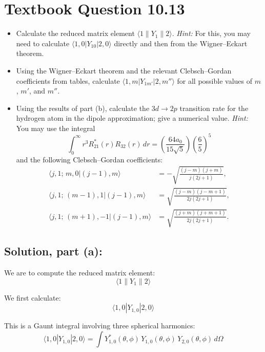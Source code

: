 \documentclass[12pt]{article}
\begin{document}
\section{Textbook Question 10.13}
    \begin{itemize}
        \item [(a)] Calculate the reduced matrix element $\langle 1 \| Y_1 \| 2 \rangle$. \textit{Hint:} For this, you may need to calculate $\langle 1, 0|Y_{10}|2, 0 \rangle$ directly and then from the Wigner–Eckart theorem.
        \item [(b)] Using the Wigner–Eckart theorem and the relevant Clebsch–Gordan coefficients from tables, calculate $\langle 1, m | Y_{1m'} | 2, m'' \rangle$ for all possible values of $m$, $m'$, and $m''$.
        \item [(c)] Using the results of part (b), calculate the $3d \rightarrow 2p$ transition rate for the hydrogen atom in the dipole approximation; give a numerical value. \textit{Hint:} You may use the integral
        \[
            \int_0^\infty r^3 R_{21}^*(r) R_{32}(r)\, dr = \left(\frac{64 a_0}{15 \sqrt{5}} \right) \left( \frac{6}{5} \right)^5
        \]
        and the following Clebsch–Gordan coefficients:
        \[
            \begin{aligned}
                \langle j, 1;\, m, 0 | (j-1), m \rangle &= -\sqrt{ \frac{(j - m)(j + m)}{j(2j + 1)} }, \\
                \langle j, 1;\, (m - 1), 1 | (j - 1), m \rangle &= \sqrt{ \frac{(j - m)(j - m + 1)}{2j(2j + 1)} }, \\
                \langle j, 1;\, (m + 1), -1 | (j - 1), m \rangle &= \sqrt{ \frac{(j + m)(j + m + 1)}{2j(2j + 1)} }.
            \end{aligned}
        \]
    \end{itemize}

    \subsection{Solution, part (a):}
        We are to compute the reduced matrix element:
        \[
            \langle 1 \parallel Y_1 \parallel 2 \rangle
        \]
        
        We first calculate:
        \[
            \langle 1, 0 | Y_{1, 0} | 2, 0 \rangle
        \]
        
        This is a Gaunt integral involving three spherical harmonics:
        \[
            \langle 1, 0 | Y_{1, 0} | 2, 0 \rangle = \int Y_{1, 0}^*(\theta, \phi)\, Y_{1, 0}(\theta, \phi)\, Y_{2, 0}(\theta, \phi)\, d\Omega
        \]
        
\end{document}
